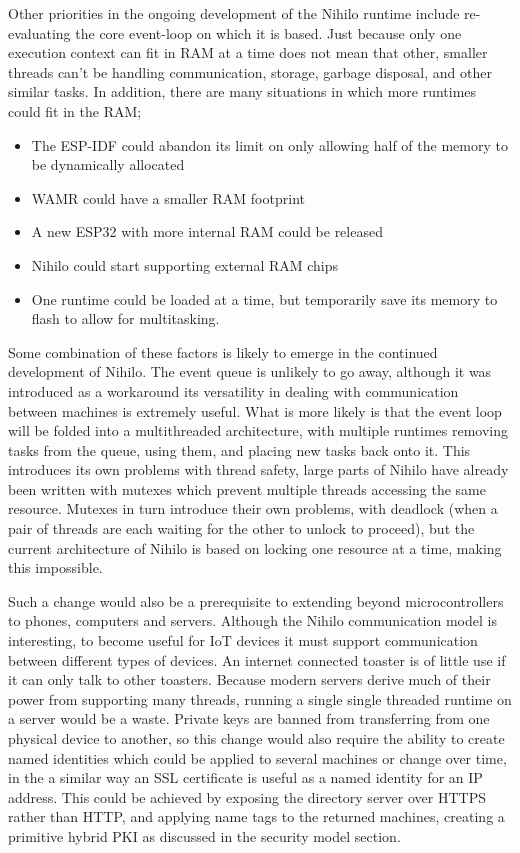 \documentclass{article}
\begin{document}
Other priorities in the ongoing development of the Nihilo runtime include re-evaluating the core event-loop on which it is based. Just because only one execution context can fit in RAM at a time does not mean that other, smaller threads can't be handling communication, storage, garbage disposal, and other similar tasks. In addition, there are many situations in which more runtimes could fit in the RAM;
\begin{itemize}
\item The ESP-IDF could abandon its limit on only allowing half of the memory to be dynamically allocated
\item WAMR could have a smaller RAM footprint
\item A new ESP32 with more internal RAM could be released
\item Nihilo could start supporting external RAM chips
\item One runtime could be loaded at a time, but temporarily save its memory to flash to allow for multitasking.
\end{itemize}

Some combination of these factors is likely to emerge in the continued development of Nihilo. The event queue is unlikely to go away, although it was introduced as a workaround its versatility in dealing with communication between machines is extremely useful. What is more likely is that the event loop will be folded into a multithreaded architecture, with multiple runtimes removing tasks from the queue, using them, and placing new tasks back onto it. This introduces its own problems with thread safety, large parts of Nihilo have already been written with mutexes which prevent multiple threads accessing the same resource. Mutexes in turn introduce their own problems, with deadlock (when a pair of threads are each waiting for the other to unlock to proceed), but the current architecture of Nihilo is based on locking one resource at a time, making this impossible.

Such a change would also be a prerequisite to extending beyond microcontrollers to phones, computers and servers. Although the Nihilo communication model is interesting, to become useful for IoT devices it must support communication between different types of devices. An internet connected toaster is of little use if it can only talk to other toasters. Because modern servers derive much of their power from supporting many threads, running a single single threaded runtime on a server would be a waste. Private keys are banned from transferring from one physical device to another, so this change would also require the ability to create named identities which could be applied to several machines or change over time, in  the a similar way an SSL certificate is useful as a named identity for an IP address. This could be achieved by exposing the directory server over HTTPS rather than HTTP, and applying name tags to the returned machines, creating a primitive hybrid PKI as discussed in the security model section.
\end{document}
